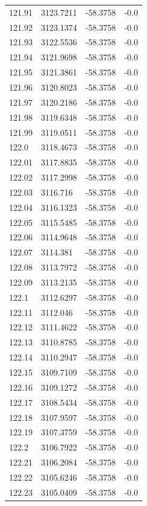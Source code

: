 \begin{table}[H]
\begin{tabular}{llll}
121.91 & 3123.7211 & -58.3758 & -0.0 \\
121.92 & 3123.1374 & -58.3758 & -0.0 \\
121.93 & 3122.5536 & -58.3758 & -0.0 \\
121.94 & 3121.9698 & -58.3758 & -0.0 \\
121.95 & 3121.3861 & -58.3758 & -0.0 \\
121.96 & 3120.8023 & -58.3758 & -0.0 \\
121.97 & 3120.2186 & -58.3758 & -0.0 \\
121.98 & 3119.6348 & -58.3758 & -0.0 \\
121.99 & 3119.0511 & -58.3758 & -0.0 \\
122.0 & 3118.4673 & -58.3758 & -0.0 \\
122.01 & 3117.8835 & -58.3758 & -0.0 \\
122.02 & 3117.2998 & -58.3758 & -0.0 \\
122.03 & 3116.716 & -58.3758 & -0.0 \\
122.04 & 3116.1323 & -58.3758 & -0.0 \\
122.05 & 3115.5485 & -58.3758 & -0.0 \\
122.06 & 3114.9648 & -58.3758 & -0.0 \\
122.07 & 3114.381 & -58.3758 & -0.0 \\
122.08 & 3113.7972 & -58.3758 & -0.0 \\
122.09 & 3113.2135 & -58.3758 & -0.0 \\
122.1 & 3112.6297 & -58.3758 & -0.0 \\
122.11 & 3112.046 & -58.3758 & -0.0 \\
122.12 & 3111.4622 & -58.3758 & -0.0 \\
122.13 & 3110.8785 & -58.3758 & -0.0 \\
122.14 & 3110.2947 & -58.3758 & -0.0 \\
122.15 & 3109.7109 & -58.3758 & -0.0 \\
122.16 & 3109.1272 & -58.3758 & -0.0 \\
122.17 & 3108.5434 & -58.3758 & -0.0 \\
122.18 & 3107.9597 & -58.3758 & -0.0 \\
122.19 & 3107.3759 & -58.3758 & -0.0 \\
122.2 & 3106.7922 & -58.3758 & -0.0 \\
122.21 & 3106.2084 & -58.3758 & -0.0 \\
122.22 & 3105.6246 & -58.3758 & -0.0 \\
122.23 & 3105.0409 & -58.3758 & -0.0 \\

\end{tabular}
\end{table}
